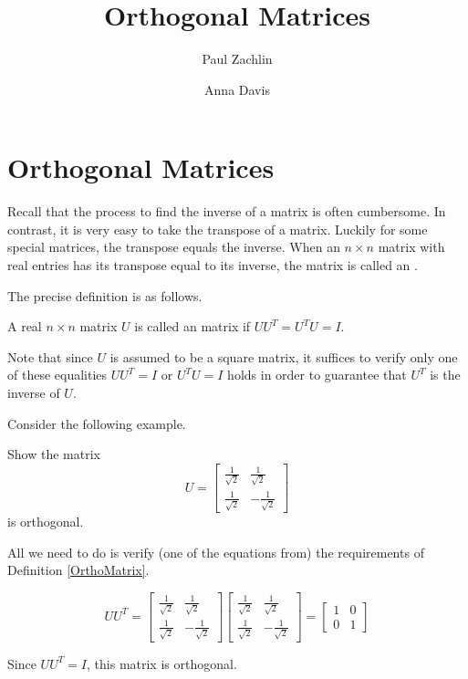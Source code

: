 \documentclass{ximera}
\author{Paul Zachlin \and Anna Davis} \title{Orthogonal Matrices} \license{CC-BY 4.0}
\begin{document}
\begin{abstract}

\end{abstract}
\maketitle

\section*{Orthogonal Matrices}
Recall that the process to find the inverse of a matrix is often cumbersome.
In contrast, it is very easy to take the transpose of a matrix. Luckily for some special matrices, the transpose equals the inverse. When an $n \times n$ matrix with real
entries has its transpose equal to its inverse, the matrix is called an .

The precise definition is as follows.

\begin{definition}\label{OrthoMatrix}
A real $n\times n$ matrix $U$ is called an  matrix if $UU^{T}=U^{T}U=I.$
\end{definition}

Note that since $U$ is assumed to be a square matrix, it suffices to verify only one of these equalities $UU^{T}=I$ or $U^{T}U=I$ holds in order to guarantee that $U^T$ is the inverse of $U$.

Consider the following example.

\begin{example}\label{ex:OrthogonalMatrix1}
Show the matrix
\begin{equation*}
U=\begin{bmatrix}
\frac{1}{\sqrt{2}} & \frac{1}{\sqrt{2}} \\
\frac{1}{\sqrt{2}} & -\frac{1}{\sqrt{2}}
\end{bmatrix}
\end{equation*}
is orthogonal.
\end{example}

\begin{explanation}
All we need to do is verify (one of the equations from) the requirements of Definition \ref{OrthoMatrix}.

\begin{equation*}
UU^{T}=\begin{bmatrix}
\frac{1}{\sqrt{2}} & \frac{1}{\sqrt{2}} \\
\frac{1}{\sqrt{2}} & -\frac{1}{\sqrt{2}}
\end{bmatrix} \begin{bmatrix}
\frac{1}{\sqrt{2}} & \frac{1}{\sqrt{2}} \\
\frac{1}{\sqrt{2}} & -\frac{1}{\sqrt{2}}
\end{bmatrix} = \begin{bmatrix}
1 & 0 \\
0 & 1
\end{bmatrix}
\end{equation*}

Since $UU^{T} = I$, this matrix is orthogonal.
\end{explanation}
\end{document}
